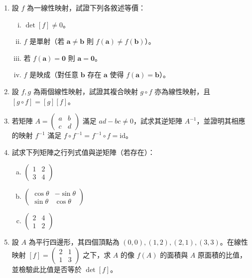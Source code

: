 \begin{enumerate}
  \item 設 $f$ 為一線性映射，試證下列各敘述等價：
  \begin{enumerate}[(i)]
    \item $\det[f] \neq 0$。
    \item $f$ 是單射（若 $\mathbf{a} \neq \mathbf{b}$ 則 $f(\mathbf{a}) \neq f(\mathbf{b})$）。
    \item 若 $f(\mathbf{a}) = \mathbf{0}$ 則 $\mathbf{a} = \mathbf{0}$。
    \item $f$ 是映成（對任意 $\mathbf{b}$ 存在 $\mathbf{a}$ 使得 $f(\mathbf{a}) = \mathbf{b}$）。
  \end{enumerate}

  \item 設 $f, g$ 為兩個線性映射，試證其複合映射 $g \circ f$ 亦為線性映射，且 $[g \circ f] = [g][f]$。

  \item 若矩陣 $A = \begin{pmatrix} a & b \\ c & d \end{pmatrix}$ 滿足 $ad - bc \neq 0$，試求其逆矩陣 $A^{-1}$，並證明其相應的映射 $f^{-1}$ 滿足 $f \circ f^{-1} = f^{-1} \circ f = \mathrm{id}$。

  \item 試求下列矩陣之行列式值與逆矩陣（若存在）：
  \begin{enumerate}[a.]
    \item $\begin{pmatrix} 1 & 2 \\ 3 & 4 \end{pmatrix}$
    \item $\begin{pmatrix} \cos\theta & -\sin\theta \\ \sin\theta & \cos\theta \end{pmatrix}$
    \item $\begin{pmatrix} 2 & 4 \\ 1 & 2 \end{pmatrix}$
  \end{enumerate}

  \item 設 $A$ 為平行四邊形，其四個頂點為 $(0, 0), (1, 2), (2, 1), (3, 3)$。在線性映射 $[f] = \begin{pmatrix} 2 & 1 \\ 1 & 3 \end{pmatrix}$ 之下，求 $A$ 的像 $f(A)$ 的面積與 $A$ 原面積的比值，並檢驗此比值是否等於 $\det[f]$。
\end{enumerate}
